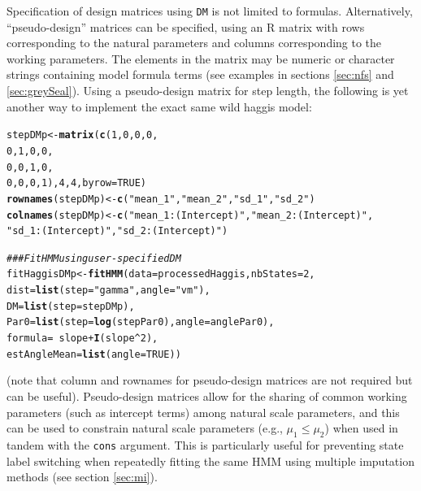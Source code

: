 \documentclass[12pt]{article}\usepackage[]{graphicx}\usepackage[]{color}
\makeatletter
\newcommand{\hlnum}[1]{\textcolor[rgb]{0.686,0.059,0.569}{#1}}%
\newcommand{\hlstr}[1]{\textcolor[rgb]{0.192,0.494,0.8}{#1}}%
\newcommand{\hlcom}[1]{\textcolor[rgb]{0.678,0.584,0.686}{\textit{#1}}}%
\newcommand{\hlopt}[1]{\textcolor[rgb]{0,0,0}{#1}}%
\newcommand{\hlstd}[1]{\textcolor[rgb]{0.345,0.345,0.345}{#1}}%
\newcommand{\hlkwb}[1]{\textcolor[rgb]{0.69,0.353,0.396}{#1}}%
\newcommand{\hlkwc}[1]{\textcolor[rgb]{0.333,0.667,0.333}{#1}}%
\newcommand{\hlkwd}[1]{\textcolor[rgb]{0.737,0.353,0.396}{\textbf{#1}}}%
\newenvironment{kframe}{%
 \def\at@end@of@kframe{}%
 \ifinner\ifhmode%
  \def\at@end@of@kframe{\end{minipage}}%
  \begin{minipage}{\columnwidth}%
 \fi\fi%
 \def\FrameCommand##1{\hskip\@totalleftmargin \hskip-\fboxsep
 \colorbox{shadecolor}{##1}\hskip-\fboxsep
     \hskip-\linewidth \hskip-\@totalleftmargin \hskip\columnwidth}%
 \MakeFramed {\advance\hsize-\width
   \@totalleftmargin\z@ \linewidth\hsize
   \@setminipage}}%
 {\par\unskip\endMakeFramed%
 \at@end@of@kframe}
\newenvironment{knitrout}{}{} %
\makeatother
\begin{document}
Specification of design matrices using \verb|DM| is not limited to formulas. Alternatively, ``pseudo-design'' matrices can be specified, using an R matrix with rows corresponding to the natural parameters and columns corresponding to the working parameters. The elements in the matrix may be numeric or character strings containing model formula terms (see examples in sections \ref{sec:nfs} and \ref{sec:greySeal}). Using a pseudo-design matrix for step length, the following is yet another way to implement the exact same wild haggis model:
\begin{knitrout}
\color{fgcolor}\begin{kframe}
\begin{alltt}
\hlstd{stepDMp} \hlkwb{<-} \hlkwd{matrix}\hlstd{(}\hlkwd{c}\hlstd{(}\hlnum{1}\hlstd{,}\hlnum{0}\hlstd{,}\hlnum{0}\hlstd{,}\hlnum{0}\hlstd{,}
                   \hlnum{0}\hlstd{,}\hlnum{1}\hlstd{,}\hlnum{0}\hlstd{,}\hlnum{0}\hlstd{,}
                   \hlnum{0}\hlstd{,}\hlnum{0}\hlstd{,}\hlnum{1}\hlstd{,}\hlnum{0}\hlstd{,}
                   \hlnum{0}\hlstd{,}\hlnum{0}\hlstd{,}\hlnum{0}\hlstd{,}\hlnum{1}\hlstd{),}\hlnum{4}\hlstd{,}\hlnum{4}\hlstd{,}\hlkwc{byrow}\hlstd{=}\hlnum{TRUE}\hlstd{)}
\hlkwd{rownames}\hlstd{(stepDMp)} \hlkwb{<-} \hlkwd{c}\hlstd{(}\hlstr{"mean_1"}\hlstd{,}\hlstr{"mean_2"}\hlstd{,}\hlstr{"sd_1"}\hlstd{,}\hlstr{"sd_2"}\hlstd{)}
\hlkwd{colnames}\hlstd{(stepDMp)} \hlkwb{<-} \hlkwd{c}\hlstd{(}\hlstr{"mean_1:(Intercept)"}\hlstd{,}\hlstr{"mean_2:(Intercept)"}\hlstd{,}
                      \hlstr{"sd_1:(Intercept)"}\hlstd{,}\hlstr{"sd_2:(Intercept)"}\hlstd{)}

\hlcom{### Fit HMM	using user-specified DM}
\hlstd{fitHaggisDMp} \hlkwb{<-} \hlkwd{fitHMM}\hlstd{(}\hlkwc{data} \hlstd{= processedHaggis,} \hlkwc{nbStates} \hlstd{=} \hlnum{2}\hlstd{,}
                       \hlkwc{dist} \hlstd{=} \hlkwd{list}\hlstd{(}\hlkwc{step} \hlstd{=} \hlstr{"gamma"}\hlstd{,} \hlkwc{angle} \hlstd{=} \hlstr{"vm"}\hlstd{),}
                       \hlkwc{DM} \hlstd{=} \hlkwd{list}\hlstd{(}\hlkwc{step} \hlstd{= stepDMp),}
                       \hlkwc{Par0} \hlstd{=} \hlkwd{list}\hlstd{(}\hlkwc{step} \hlstd{=} \hlkwd{log}\hlstd{(stepPar0),} \hlkwc{angle} \hlstd{= anglePar0),}
                       \hlkwc{formula} \hlstd{=} \hlopt{~} \hlstd{slope} \hlopt{+} \hlkwd{I}\hlstd{(slope}\hlopt{^}\hlnum{2}\hlstd{),}
                       \hlkwc{estAngleMean} \hlstd{=} \hlkwd{list}\hlstd{(}\hlkwc{angle}\hlstd{=}\hlnum{TRUE}\hlstd{))}
\end{alltt}
\end{kframe}
\end{knitrout}
\noindent (note that column and rownames for pseudo-design matrices are not required but can be useful). Pseudo-design matrices allow for the sharing of common working parameters (such as intercept terms) among natural scale parameters, and this can be used to constrain natural scale parameters (e.g., $\mu_1 \le \mu_2$) when used in tandem with the \verb|cons| argument.  This is particularly useful for preventing state label switching when repeatedly fitting the same HMM using multiple imputation methods (see section \ref{sec:mi}).
\end{document}
